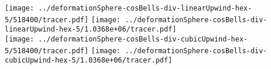 \documentclass{article}
\begin{document}
\texttt{[image: ../deformationSphere-cosBells-div-linearUpwind-hex-5/518400/tracer.pdf]}
\texttt{[image: ../deformationSphere-cosBells-div-linearUpwind-hex-5/1.0368e+06/tracer.pdf]} \\
\texttt{[image: ../deformationSphere-cosBells-div-cubicUpwind-hex-5/518400/tracer.pdf]}
\texttt{[image: ../deformationSphere-cosBells-div-cubicUpwind-hex-5/1.0368e+06/tracer.pdf]}
\end{document}
